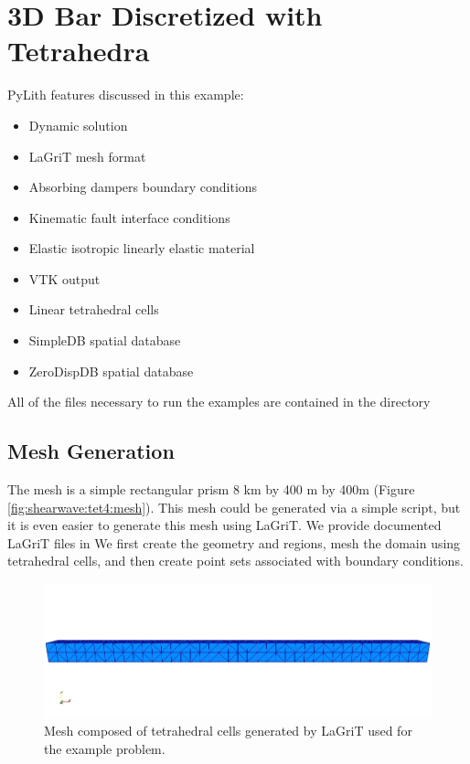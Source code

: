 \section{3D Bar Discretized with Tetrahedra}
\label{sec:example:shearwave:tet4}

PyLith features discussed in this example:
\begin{itemize}
\item Dynamic solution
\item LaGriT mesh format
\item Absorbing dampers boundary conditions
\item Kinematic fault interface conditions
\item Elastic isotropic linearly elastic material
\item VTK output
\item Linear tetrahedral cells
\item SimpleDB spatial database
\item ZeroDispDB spatial database
\end{itemize}
All of the files necessary to run the examples are contained in the
directory 


\subsection{Mesh Generation}

The mesh is a simple rectangular prism 8 km by 400 m by 400m (Figure
\vref{fig:shearwave:tet4:mesh}). This mesh could be generated via
a simple script, but it is even easier to generate this mesh using
LaGriT. We provide documented LaGriT files in 
We first create the geometry and regions, mesh the domain using tetrahedral
cells, and then create point sets associated with boundary conditions.

\begin{figure}
  \includegraphics[scale=0.5]{examples/figs/shearwave_tet4mesh}
  \caption{Mesh composed of tetrahedral cells generated by LaGriT used for the
    example problem.}
  \label{fig:shearwave:tet4:mesh}
\end{figure}



